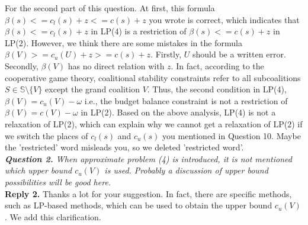 \documentclass[11pt]{article}
\begin{document}
For the second part of this question.
At first, this formula $\beta(s) <= c_l(s) + z <= c(s) + z$ you wrote is correct, which indicates that $\beta(s) <= c_l(s) + z$ in LP(4) is a restriction of $\beta(s) <= c(s) + z$ in LP(2).
However, we think there are some mistakes in the formula $\beta(V) >= c_u(U) + z >= c(s) + z$. Firstly, $U$ should be a written error. Secondly, $\beta(V)$ has no direct relation with $z$.
In fact, according to the cooperative game theory, coalitional stability constraints refer to all subcoalitions $S \in \mathbb{S} \setminus \big\{V\big\}$ except the grand coalition $V$.
Thus, the second condition in LP(4),
$\beta(V)=c_u(V)-\omega$ i.e., the budget balance constraint is not a restriction of $\beta(V)=c(V)-\omega$ in LP(2).
Based on the above analysis, LP(4) is not a relaxation of LP(2), which can explain why we cannot get a relaxation of LP(2) if we switch the places of $c_l(s)$ and $c_u(s)$ you mentioned in Question 10.
Maybe the 'restricted' word misleads you, so we deleted 'restricted word'.
\\[4mm]
%
%
%
\noindent \textit{\textbf{Question 2.}
When approximate problem (4) is introduced, it is not mentioned which upper bound $c_u(V)$ is used. Probably a discussion of upper bound possibilities will be good here.}
\\[2mm]
\noindent \textbf{Reply 2.}
Thanks a lot for your suggestion.
In fact, there are specific methods, such as LP-based methods, which can be used to obtain the upper bound $c_u(V)$. We add this clarification.
\end{document}
